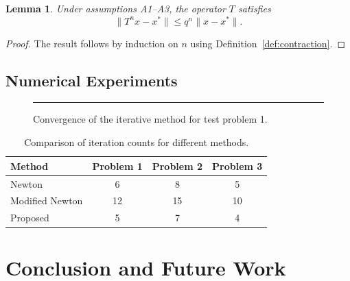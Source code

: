 \documentclass[12pt, a4paper, oneside]{book}
\theoremstyle{plain}
\newtheorem{lemma}[theorem]{Lemma}
\theoremstyle{definition}
\begin{document}
\begin{lemma}
    \label{lem:key}
    Under assumptions A1--A3, the operator $T$ satisfies
    \begin{equation}
        \lVert T^{n} x - x^{*} \rVert \leq q^{n} \lVert x - x^{*} \rVert.
        \label{eq:contraction_bound}
    \end{equation}
\end{lemma}

\begin{proof}
    The result follows by induction on $n$ using
    Definition~\ref{def:contraction}.
\end{proof}

\section{Numerical Experiments}
\label{sec:numerical}
\lipsum[9]

\begin{figure}[htbp]
    \centering
    \rule{0.7\textwidth}{5cm}   %
    \caption{Convergence of the iterative method for test problem 1.}
    \label{fig:convergence}
\end{figure}

\begin{table}[htbp]
    \centering
    \caption{Comparison of iteration counts for different methods.}
    \label{tab:comparison}
    \begin{tabular}{lccc}
        \toprule
        \textbf{Method} & \textbf{Problem 1} & \textbf{Problem 2}
                         & \textbf{Problem 3} \\
        \midrule
        Newton           &  6  &  8  &  5 \\
        Modified Newton  & 12  & 15  & 10 \\
        Proposed         &  5  &  7  &  4 \\
        \bottomrule
    \end{tabular}
\end{table}

\chapter{Conclusion and Future Work}
\label{ch:conclusion}
\end{document}
